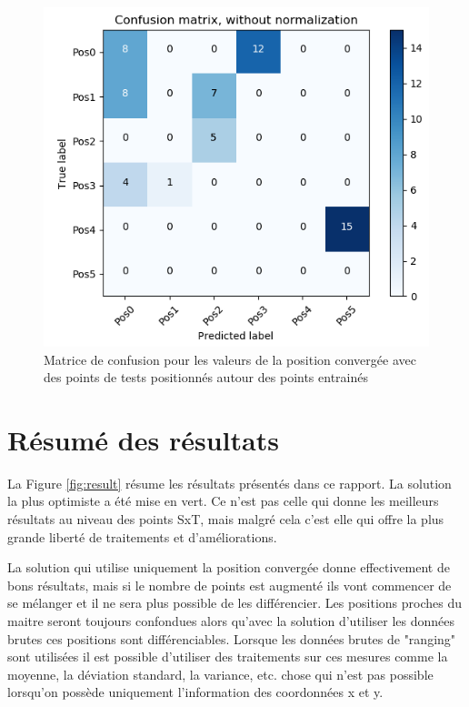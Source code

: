 \begin{figure}[htp]
 \begin{center}
  \includegraphics[scale=0.5]{figures/mat_pos_conv_Tx.png}
  \caption{Matrice de confusion pour les valeurs de la position convergée avec des points de tests positionnés autour des points entrainés}
  \label{fig:matPosConvTx} %
 \end{center}
\end{figure}

\section{Résumé des résultats}
La Figure \ref{fig:result} résume les résultats présentés dans ce rapport. La solution la plus optimiste a été mise en vert. Ce n'est pas celle qui donne les meilleurs résultats au niveau des points SxT, mais malgré cela c'est elle qui offre la plus grande liberté de traitements et d'améliorations. 

La solution qui utilise uniquement la position convergée donne effectivement de bons résultats, mais si le nombre de points est augmenté ils vont commencer de se mélanger et il ne sera plus possible de les différencier. Les positions proches du maitre seront toujours confondues alors qu'avec la solution d'utiliser les données brutes ces positions sont différenciables. Lorsque les données brutes de "ranging" sont utilisées il est possible d'utiliser des traitements sur ces mesures comme la moyenne, la déviation standard, la variance, etc. chose qui n'est pas possible lorsqu'on possède uniquement l'information des coordonnées x et y. 


